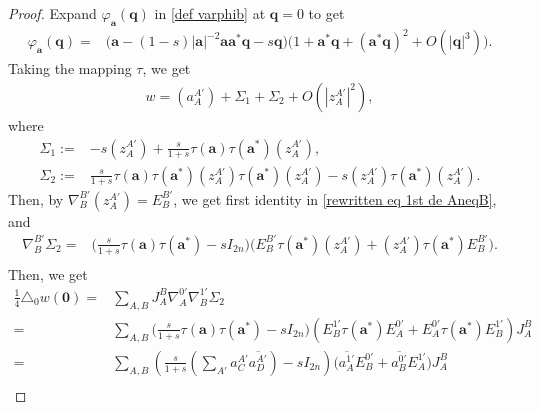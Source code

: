 \documentclass[a4paper,11pt]{amsart}
\numberwithin{equation}{section}
\begin{document}
\begin{proof}

Expand $\varphi_{\mathbf{a}}(\mathbf{q})$ in \eqref{def varphib} at $\mathbf{q}=0$ to get
\begin{equation}\begin{aligned}\label{taylor}
\varphi_{\mathbf{a}}(\mathbf{q})
=&\bigg(\mathbf{a}-(1-s)|\mathbf{a}|^{-2}\mathbf{a}\mathbf{a}^*\mathbf{q}-s\mathbf{q}\bigg)\bigg(1+\mathbf{a}^*\mathbf{q}+\left(\mathbf{a}^*\mathbf{q}\right)^2+O(|\mathbf{q}|^3)\bigg).
\end{aligned}\end{equation}
Taking the mapping $\tau$, we get
\begin{equation}\begin{aligned}
w=\left(a_A^{A'}\right)+\Sigma_1+\Sigma_2+O(|z_A^{A'}|^2),
\end{aligned}\end{equation}
where
\begin{equation}\begin{aligned}
\Sigma_1:=&-s\left(z^{A'}_A\right)+\frac{s}{1+s}\tau(\mathbf{a})\tau(\mathbf{a}^*)\left(z^{A'}_A\right),\\
\Sigma_2:=&\frac{s}{1+s}\tau(\mathbf{a})\tau(\mathbf{a}^*)\left(z^{A'}_A\right)\tau(\mathbf{a}^*)\left(z^{A'}_A\right)-s\left(z^{A'}_A\right)\tau(\mathbf{a}^*)\left(z^{A'}_A\right).
\end{aligned}\end{equation}
Then, by $\nabla_B^{B'}\left(z_A^{A'}\right)=E_B^{B'}$, we get first identity in \eqref{rewritten eq 1st de AneqB}, and
\begin{equation}\begin{aligned}
\nabla_B^{B'}\Sigma_2=&\bigg(\frac{s}{1+s}\tau(\mathbf{a})\tau(\mathbf{a}^*)-sI_{2n}\bigg)\bigg(E_B^{B'}\tau(\mathbf{a}^*)\left(z_A^{A'}\right)+\left(z_A^{A'}\right)\tau(\mathbf{a}^*)E_B^{B'}\bigg).\\
\end{aligned}\end{equation}
Then, we get
\begin{equation}\begin{aligned}
\frac14\triangle_0 w(\mathbf{0})=&\sum_{A,B}J_A^B\nabla_A^{0'}\nabla_B^{1'}\Sigma_2\\
=&\sum_{A,B}\bigg(\frac{s}{1+s}\tau(\mathbf{a})\tau(\mathbf{a}^*)-sI_{2n}\bigg)\left(E_B^{1'}\tau(\mathbf{a}^*)E_A^{0'}+E_A^{0'}\tau(\mathbf{a}^*)E_B^{1'}\right)J_A^B\\
=&\sum_{A,B}\left(\frac{s}{1+s}\left(\sum_{A'}a_C^{A'}\overline{a_D^{A'}}\right)-sI_{2n}\right)\bigg(\overline{a_A^{1'}}E_B^{0'}+\overline{a_B^{0'}}E_A^{1'}\bigg)J_A^B\\

\end{aligned}
\end{equation}
\end{proof}
\end{document}

